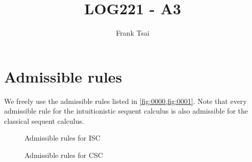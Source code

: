 \documentclass[a4paper]{article}
\title{LOG221 - A3}
\author{Frank Tsai}
\begin{document}
\maketitle

\section*{Admissible rules}

We freely use the admissible rules listed in \cref{fig:0000,fig:0001}.
Note that every admissible rule for the intuitionistic sequent calculus is also admissible for the classical sequent calculus.

\begin{figure}[h]
  \centering
  \caption{Admissible rules for ISC}
  \label{fig:0000}
\end{figure}
\begin{figure}[h]
  \centering
  \caption{Admissible rules for CSC}
  \label{fig:0001}
\end{figure}
\end{document}
